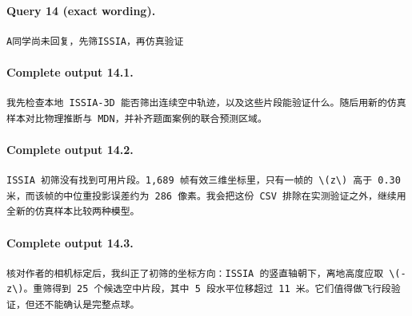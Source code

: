 \documentclass[UTF8,10pt]{ctexart}
\begin{document}
\paragraph{Query 14 (exact wording).}
\begin{Verbatim}[breaklines=true,breakanywhere=true,fontsize=\scriptsize,frame=single,framesep=2pt]
A同学尚未回复，先筛ISSIA，再仿真验证
\end{Verbatim}

\paragraph{Complete output 14.1.}
\begin{Verbatim}[breaklines=true,breakanywhere=true,fontsize=\scriptsize,frame=single,framesep=2pt]
我先检查本地 ISSIA-3D 能否筛出连续空中轨迹，以及这些片段能验证什么。随后用新的仿真样本对比物理推断与 MDN，并补齐题面案例的联合预测区域。
\end{Verbatim}

\paragraph{Complete output 14.2.}
\begin{Verbatim}[breaklines=true,breakanywhere=true,fontsize=\scriptsize,frame=single,framesep=2pt]
ISSIA 初筛没有找到可用片段。1,689 帧有效三维坐标里，只有一帧的 \(z\) 高于 0.30 米，而该帧的中位重投影误差约为 286 像素。我会把这份 CSV 排除在实测验证之外，继续用全新的仿真样本比较两种模型。
\end{Verbatim}

\paragraph{Complete output 14.3.}
\begin{Verbatim}[breaklines=true,breakanywhere=true,fontsize=\scriptsize,frame=single,framesep=2pt]
核对作者的相机标定后，我纠正了初筛的坐标方向：ISSIA 的竖直轴朝下，离地高度应取 \(-z\)。重筛得到 25 个候选空中片段，其中 5 段水平位移超过 11 米。它们值得做飞行段验证，但还不能确认是完整点球。
\end{Verbatim}
\end{document}
